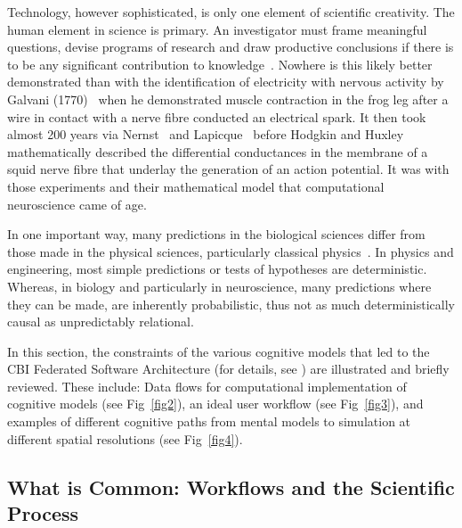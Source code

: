 \documentclass[10pt,letterpaper]{article}
\begin{document}
Technology, however sophisticated, is only one element of scientific creativity. The human element in science is primary. An investigator must frame meaningful questions, devise programs of research and draw productive conclusions if there is to be any significant contribution to knowledge~\cite{clarke87}. Nowhere is this likely better demonstrated than with the identification of electricity with nervous activity by Galvani (1770)~\cite{galvani91} when he demonstrated muscle contraction in the frog leg after a wire in contact with a nerve fibre conducted an electrical spark. It then took almost 200 years via Nernst~\cite{nernst89} and Lapicque~\cite{lapicque07} before Hodgkin and Huxley~\cite{hodgkin52e} mathematically described the differential conductances in the membrane of a squid nerve fibre that underlay the generation of an action potential. It was with those experiments and their mathematical model that computational neuroscience came of age.

In one important way, many predictions in the biological sciences differ from those made in the physical sciences, particularly classical physics~\cite{darwin71}. In physics and engineering, most simple predictions or tests of hypotheses are deterministic. Whereas, in biology and particularly in neuroscience, many predictions where they can be made, are inherently probabilistic, thus not as much deterministically causal as unpredictably relational.

In this section, the constraints of the various cognitive models that led to the CBI Federated Software Architecture (for details, see \cite{cornelis12,cornelis08:_cbi_archit_comput_simul_realis}) are illustrated and briefly reviewed. These include: Data flows for computational implementation of cognitive models (see Fig~\ref{fig2}), an ideal user workflow (see Fig~\ref{fig3}), and examples of different cognitive paths from mental models to simulation at different spatial resolutions (see Fig~\ref{fig4}).

\subsection*{What is Common: Workflows and the Scientific Process}
\end{document}
